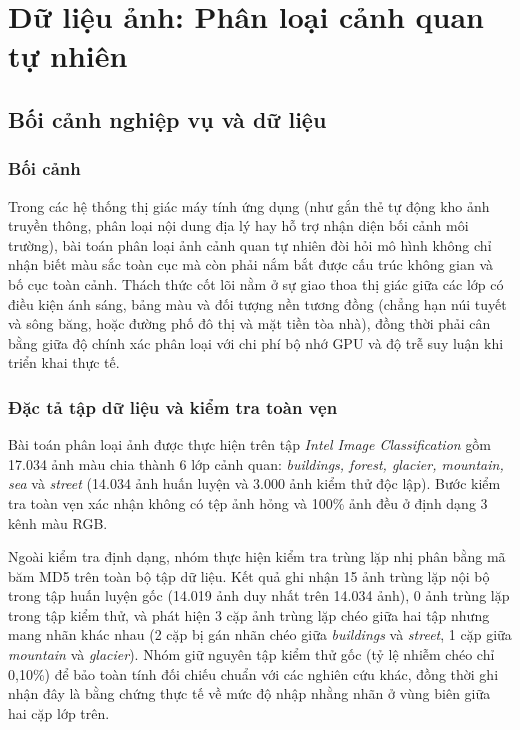 \section{Dữ liệu ảnh: Phân loại cảnh quan tự nhiên}
\label{sec:image}

\subsection{Bối cảnh nghiệp vụ và dữ liệu}
\label{subsec:img_context}

\subsubsection{Bối cảnh}
Trong các hệ thống thị giác máy tính ứng dụng (như gắn thẻ tự động kho ảnh truyền thông, phân loại nội dung địa lý hay hỗ trợ nhận diện bối cảnh môi trường), bài toán phân loại ảnh cảnh quan tự nhiên đòi hỏi mô hình không chỉ nhận biết màu sắc toàn cục mà còn phải nắm bắt được cấu trúc không gian và bố cục toàn cảnh. Thách thức cốt lõi nằm ở sự giao thoa thị giác giữa các lớp có điều kiện ánh sáng, bảng màu và đối tượng nền tương đồng (chẳng hạn núi tuyết và sông băng, hoặc đường phố đô thị và mặt tiền tòa nhà), đồng thời phải cân bằng giữa độ chính xác phân loại với chi phí bộ nhớ GPU và độ trễ suy luận khi triển khai thực tế.

\subsubsection{Đặc tả tập dữ liệu và kiểm tra toàn vẹn}
Bài toán phân loại ảnh được thực hiện trên tập \textit{Intel Image Classification} \cite{bansal2019intel} gồm 17.034 ảnh màu chia thành 6 lớp cảnh quan: \textit{buildings, forest, glacier, mountain, sea} và \textit{street} (14.034 ảnh huấn luyện và 3.000 ảnh kiểm thử độc lập). Bước kiểm tra toàn vẹn xác nhận không có tệp ảnh hỏng và 100\% ảnh đều ở định dạng 3 kênh màu RGB.

Ngoài kiểm tra định dạng, nhóm thực hiện kiểm tra trùng lặp nhị phân bằng mã băm MD5 trên toàn bộ tập dữ liệu. Kết quả ghi nhận 15 ảnh trùng lặp nội bộ trong tập huấn luyện gốc (14.019 ảnh duy nhất trên 14.034 ảnh), 0 ảnh trùng lặp trong tập kiểm thử, và phát hiện 3 cặp ảnh trùng lặp chéo giữa hai tập nhưng mang nhãn khác nhau (2 cặp bị gán nhãn chéo giữa \textit{buildings} và \textit{street}, 1 cặp giữa \textit{mountain} và \textit{glacier}). Nhóm giữ nguyên tập kiểm thử gốc (tỷ lệ nhiễm chéo chỉ 0,10\%) để bảo toàn tính đối chiếu chuẩn với các nghiên cứu khác, đồng thời ghi nhận đây là bằng chứng thực tế về mức độ nhập nhằng nhãn ở vùng biên giữa hai cặp lớp trên.

